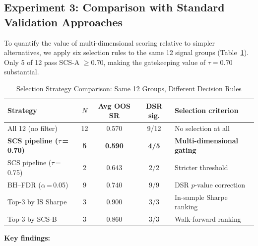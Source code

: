 \documentclass[12pt,a4paper]{article}
\begin{document}
\subsection{Experiment 3: Comparison with Standard Validation Approaches}
\label{sec:comparison}

To quantify the value of multi-dimensional scoring relative to simpler alternatives, we apply six selection rules to the same 12 signal groups (Table~\ref{tab:comparison}). Only 5 of 12 pass SCS-A $\geq 0.70$, making the gatekeeping value of $\tau=0.70$ substantial.

\begin{table}[H]
\centering
\caption{Selection Strategy Comparison: Same 12 Groups, Different Decision Rules}
\label{tab:comparison}
\small
\begin{tabular}{lcccl}
\toprule
Strategy & $N$ & Avg OOS SR & DSR sig. & Selection criterion \\
\midrule
All 12 (no filter)            & 12 & 0.570 & 9/12 & No selection at all \\
\textbf{SCS pipeline ($\tau$\,=\,0.70)} & \textbf{5} & \textbf{0.590} & \textbf{4/5} & \textbf{Multi-dimensional gating} \\
SCS pipeline ($\tau$\,=\,0.75) & 2 & 0.643 & 2/2 & Stricter threshold \\
BH--FDR ($\alpha$\,=\,0.05)   & 9 & 0.740 & 9/9 & DSR $p$-value correction \\
Top-3 by IS Sharpe            & 3 & 0.900 & 3/3 & In-sample Sharpe ranking \\
Top-3 by SCS-B                & 3 & 0.860 & 3/3 & Walk-forward ranking \\
\bottomrule
\end{tabular}
\end{table}

\textbf{Key findings:}
\end{document}
